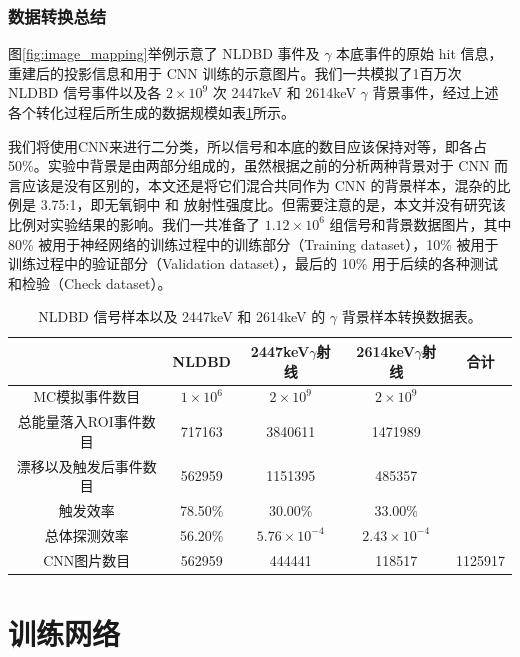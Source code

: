 \subsubsection{数据转换总结}

图\ref{fig:image_mapping}举例示意了 NLDBD 事件及 $\gamma$ 本底事件的原始 hit 信息，重建后的投影信息和用于 CNN 训练的示意图片。我们一共模拟了1百万次 NLDBD 信号事件以及各 $2\times10^9$ 次
 2447keV 和 2614keV $\gamma$ 背景事件，经过上述各个转化过程后所生成的数据规模如表\ref{tab:convert}所示。

我们将使用CNN来进行二分类，所以信号和本底的数目应该保持对等，即各占 50\%。实验中背景是由两部分组成的，虽然根据之前的分析两种背景对于 CNN 而言应该是没有区别的，本文还是将它们混合共同作为 CNN 的背景样本，混杂的比例是 3.75:1，即无氧铜中 \utte 和 \thttt 放射性强度比。但需要注意的是，本文并没有研究该比例对实验结果的影响。我们一共准备了 $1.12\times10^6$ 组信号和背景数据图片，其中 80\% 被用于神经网络的训练过程中的训练部分（Training dataset），10\% 被用于训练过程中的验证部分（Validation dataset），最后的 10\% 用于后续的各种测试和检验（Check dataset）。
        
\renewcommand\arraystretch{1.4}
\begin{table}
    \centering
    \caption{NLDBD 信号样本以及 2447keV 和 2614keV 的 $\gamma$ 背景样本转换数据表。}
    \begin{tabular*}{\textwidth}{@{\extracolsep{\fill}}ccccc}
        \hline
        \hline							
        	&	NLDBD	&	2447keV$\gamma$射线	&	2614keV$\gamma$射线	&	合计	\\
        \hline
        MC模拟事件数目	&	$1\times10^6$	&	$2\times10^9$	&	$2\times10^9$	&		\\
        总能量落入ROI事件数目	&	717163	&	3840611	&	1471989	&		\\
        漂移以及触发后事件数目	&	562959	&	1151395	&	485357	&		\\
        触发效率	&	78.50\%	&	30.00\%	&	33.00\%	&		\\
        总体探测效率	&	56.20\%	&	$5.76\times10^{-4}$	&	$2.43\times10^{-4}$	&		\\
        CNN图片数目	&	562959	&	444441	&	118517	&	1125917	\\
        \hline
        \hline
    \end{tabular*}
    \label{tab:convert}
\end{table}

\section{训练网络}
\label{section:train}

